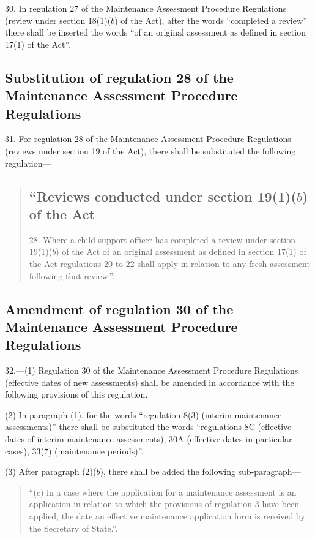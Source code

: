 \documentclass[12pt,a4paper]{article}
\begin{document}
30.  In regulation 27 of the Maintenance Assessment Procedure Regulations (review under section 18(1)($b$) of the Act), after the words “completed a review” there shall be inserted the words “of an original assessment as defined in section 17(1) of the Act”.

\subsection[31. Substitution of regulation 28 of the Maintenance Assessment Procedure Regulations]{Substitution of regulation 28 of the Maintenance Assessment Procedure Regulations}

31.  For regulation 28 of the Maintenance Assessment Procedure Regulations (reviews under section 19 of the Act), there shall be substituted the following regulation—
\begin{quotation}
\subsection*{“Reviews conducted under section 19(1)($b$) of the Act}

28.  Where a child support officer has completed a review under section 19(1)($b$) of the Act of an original assessment as defined in section 17(1) of the Act regulations 20 to 22 shall apply in relation to any fresh assessment following that review.”.
\end{quotation}

\subsection[32. Amendment of regulation 30 of the Maintenance Assessment Procedure Regulations]{Amendment of regulation 30 of the Maintenance Assessment Procedure Regulations}

32.—(1) Regulation 30 of the Maintenance Assessment Procedure Regulations (effective dates of new assessments) shall be amended in accordance with the following provisions of this regulation.

(2) In paragraph (1), for the words “regulation 8(3) (interim maintenance assessments)” there shall be substituted the words “regulations 8C (effective dates of interim maintenance assessments), 30A (effective dates in particular cases), 33(7) (maintenance periods)”.

(3) After paragraph (2)($b$), there shall be added the following sub-\hspace{0pt}paragraph—
\begin{quotation}
“($c$) in a case where the application for a maintenance assessment is an application in relation to which the provisions of regulation 3 have been applied, the date an effective maintenance application form is received by the Secretary of State.”.
\end{quotation}
\end{document}
